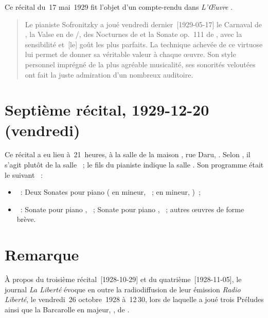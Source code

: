 Ce récital du~17 mai~1929 fit l'objet d'un compte-rendu dans \emph{L'Œuvre}
\citep[voir][]{oeuvre1929-05-24}.

\begin{quotation}
 Le pianiste Sofronitzky a joué vendredi dernier~[1929-05-17] le Carnaval de
 \Schumann{}, la Valse en \kA de \Schubert{}/\Liszt{}, des Nocturnes de
 \Chopin{} et la Sonate op.\@~111 de \Beethoven{}, avec la sensibilité
 et~[le] goût les plus parfaits.
 La technique achevée de ce virtuose lui permet de donner sa véritable
 valeur à chaque œuvre.
 Son style personnel imprégné de la plus agréable musicalité, ses sonorités
 veloutées ont fait la juste admiration d'un nombreux auditoire.%
\end{quotation}

\section{Septième récital, 1929-12-20 (vendredi)}
\label{rec:Paris7}

Ce récital a eu lieu à~21~heures, à la salle \Chopin{} de la maison
\Pleyel{}, rue Daru, .
Selon \citet[p.~401]{Scriabine}, il s'agit plutôt de la salle \Debussy{}~;
le fils du pianiste indique la salle \Chopin{}.
Son programme était le suivant \citep[voir][]{Nekrasova08, Semaine392,
Semaine394, White}~:
\begin{itemize}
 \item
 \Chopin{}~: Deux Sonates pour piano ( en \kB mineur, ~;
  en \kB \Flat mineur, )~;
 \item
 \Scriabine{}~: Sonate pour piano , ~; Sonate pour piano
 , ~; autres œuvres de forme brève.
\end{itemize}

\section*{Remarque}

À propos du troisième récital~[1928-10-29] et du quatrième~[1928-11-05], le
journal \emph{La Liberté} \citep[voir][]{liberte1928-10-26} évoque en outre
la radio\-diffusion de leur émission \emph{Radio Liberté}, le vendredi~26
octobre~1928 à~12\,30, lors de laquelle \VSofronitsky{} a joué
trois Préludes ainsi que la Barcarolle en \kF \Sharp majeur, , de
\Chopin{}.
